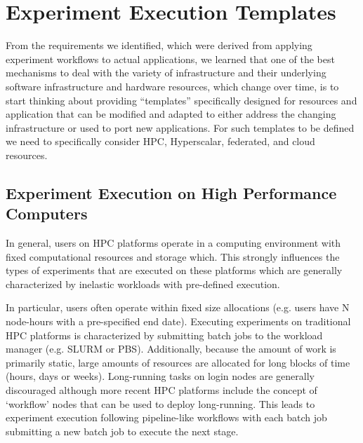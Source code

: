 \documentclass[utf8]{FrontiersinVancouver} %
\begin{document}
\section{Experiment Execution Templates}

From the requirements we identified, which were derived from applying experiment workflows to actual applications, we learned that one of the best mechanisms to deal with the variety of infrastructure and their underlying software infrastructure and hardware resources, which change over time, is to start thinking about providing ``templates'' specifically designed for resources and application that can be modified and adapted to either address the changing infrastructure or used to port new applications. For such templates to be defined we need to specifically consider HPC, Hyperscalar, federated, and cloud resources.

\subsection{Experiment Execution on High Performance Computers}

In general, users on HPC platforms operate in a computing environment with fixed computational resources and storage which. This strongly influences the types of experiments that are executed on these platforms which are generally characterized by inelastic workloads with pre-defined execution.

In particular, users often operate within fixed size allocations (e.g. users have N node-hours with a pre-specified end date). Executing experiments on traditional HPC platforms is characterized by submitting batch jobs to the workload manager (e.g. SLURM or PBS). Additionally, because the amount of work is primarily static, large amounts of resources are allocated for long blocks of time (hours, days or weeks). Long-running tasks on login nodes are generally discouraged although more recent HPC platforms include the concept of `workflow' nodes that can be used to deploy long-running. This leads to experiment execution following pipeline-like workflows with each batch job submitting a new batch job to execute the next stage.
\end{document}
